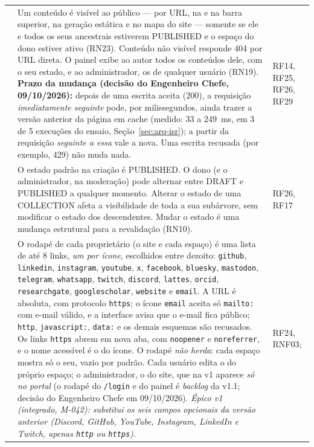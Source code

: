 \begin{longtable}{@{}L{1.3cm}L{9.6cm}L{2.8cm}@{}}
 & Um conteúdo é visível ao público --- por URL, na  e na barra superior, na geração estática e no mapa do site --- somente se ele e todos os seus ancestrais estiverem PUBLISHED e o espaço do dono estiver ativo (RN23). Conteúdo não visível responde 404 por URL direta. O painel exibe ao autor todos os conteúdos dele, com o seu estado, e ao administrador, os de qualquer usuário (RN19). \textbf{Prazo da mudança (decisão do Engenheiro Chefe, 09/10/2026):} depois de uma escrita aceita (200), a requisição \emph{imediatamente seguinte} pode, por milissegundos, ainda trazer a versão anterior da página em cache (medido: 33 a 249~ms, em 3 de 5 execuções do ensaio, Seção~\ref{sec:arq-isr}); a partir da requisição \emph{seguinte a essa} vale a nova. Uma escrita recusada (por exemplo, 429) não muda nada. & RF14, RF25, RF26, RF29\\[1pt]
 & O estado padrão na criação é PUBLISHED. O dono (e o administrador, na moderação) pode alternar entre DRAFT e PUBLISHED a qualquer momento. Alterar o estado de uma COLLECTION afeta a visibilidade de toda a sua subárvore, sem modificar o estado dos descendentes. Mudar o estado é uma mudança estrutural para a revalidação (RN10). & RF26, RF17\\[1pt]
 & O rodapé de cada proprietário (o site e cada espaço) é uma lista de até 8 links, \emph{um por ícone}, escolhidos entre dezoito: \texttt{github}, \texttt{linkedin}, \texttt{instagram}, \texttt{youtube}, \texttt{x}, \texttt{facebook}, \texttt{bluesky}, \texttt{mastodon}, \texttt{telegram}, \texttt{whatsapp}, \texttt{twitch}, \texttt{discord}, \texttt{lattes}, \texttt{orcid}, \texttt{researchgate}, \texttt{googlescholar}, \texttt{website} e \texttt{email}. A URL é absoluta, com protocolo \texttt{https}; o ícone \texttt{email} aceita só \texttt{mailto:} com e-mail válido, e a interface avisa que o e-mail fica público; \texttt{http}, \texttt{javascript:}, \texttt{data:} e os demais esquemas são recusados. Os links \texttt{https} abrem em nova aba, com \texttt{noopener} e \texttt{noreferrer}, e o nome acessível é o do ícone. O rodapé \emph{não herda}: cada espaço mostra só o seu, vazio por padrão. Cada usuário edita o do próprio espaço; o administrador, o do site, que na v1 aparece \emph{só no portal} (o rodapé do \texttt{/login} e do painel é \emph{backlog} da v1.1; decisão do Engenheiro Chefe em 09/10/2026). \emph{Épico v1 (integrado, M-042): substitui os seis campos opcionais da versão anterior (Discord, GitHub, YouTube, Instagram, LinkedIn e Twitch, apenas \texttt{http} ou \texttt{https}).} & RF24, RNF03; \\[1pt]

\end{longtable}
